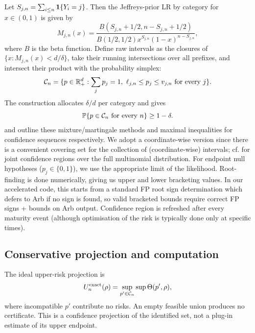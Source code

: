 Let $S_{j,n} = \sum_{i \leq n} \mathbf 1\{Y_i = j\}$. Then the Jeffreys-prior LR by category for $x \in (0,1)$ is given by
\begin{equation}\label{eq:mixture}
 M_{j,n}(x)=\frac{B(S_{j,n}+1/2,n-S_{j,n}+1/2)}
 {B(1/2,1/2)x^{S_{j,n}}(1-x)^{n-S_{j,n}}},
\end{equation}
where $B$ is the beta function. Define raw intervals as the closures of $\{x:M_{j,n}(x)<d/\delta\}$, take their running intersections over all prefixes, and intersect their product with the probability simplex:
\begin{equation}\label{eq:CS}
 \mathcal C_n=\{p\in\mathbb R_+^d:\sum_jp_j=1,
              \ \ell_{j,n}\le p_j\le v_{j,n}\text{ for every }j\}.
\end{equation}
The construction allocates $\delta/d$ per category and gives
\begin{equation}\label{eq:CSguarantee}
 \mathbb P\{p\in\mathcal C_n\text{ for every }n\}\ge1-\delta.
\end{equation}
\citet{howard2021} and \citet{ramdas2023} outline these mixture/martingale methods and maximal inequalities for confidence sequences respectively. We adopt a coordinate-wise version since there is a convenient covering set for the collection of (coordinate-wise) intervals; cf. \citep{lindon2022} for joint confidence regions over the full multinomial distribution. For endpoint null hypotheses ($p_j\in\{0,1\}$), we use the appropriate limit of the likelihood. Root-finding is done numerically, giving us upper and lower bracketing values. In our accelerated code, this starts from a standard FP root sign determination which defers to Arb if no sign is found, so valid bracketed bounds require correct FP signs + bounds on Arb output. Confidence region is refreshed after every maturity event (although optimisation of the risk is typically done only at specific times).

\subsection{Conservative projection and computation}
The ideal upper-risk projection is
\begin{equation}\label{eq:idealprojection}
 U_n^{\rm exact}(\rho)=\sup_{p'\in\mathcal C_n}\sup\Theta(p',\rho),
\end{equation}
where incompatible $p'$ contribute no risks. An empty feasible union produces no certificate. This is a confidence projection of the identified set, not a plug-in estimate of its upper endpoint.

